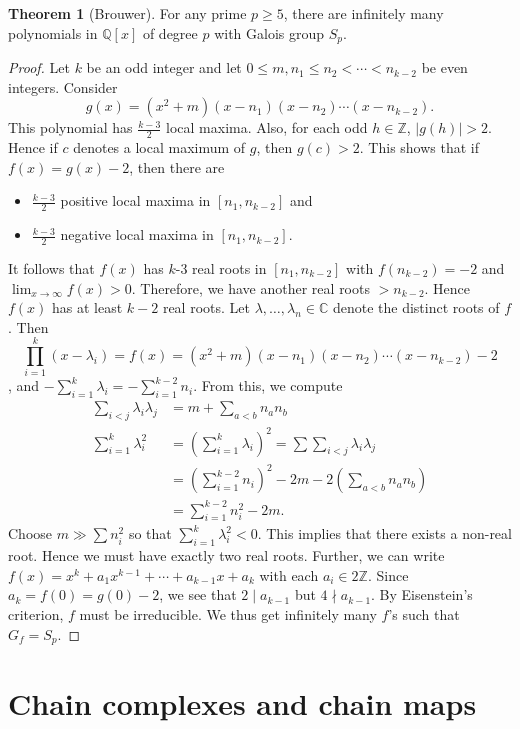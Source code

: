 \documentclass[10pt,letterpaper,cm]{nupset}
\theoremstyle{definition}
\theoremstyle{theorem}
\newtheorem{theorem}[definition]{Theorem}
\theoremstyle{remark}
\newcommand{\C}{\mathbb C}
\newcommand{\Q}{\mathbb Q}
\newcommand{\Z}{\mathbb Z}
\newcommand{\1}{\mathbf{1}}
\newcommand{\0}{\vec 0}
\begin{document}
\begin{theorem}[Brouwer]
For any prime $p \geq 5$, there are infinitely many polynomials in $\Q[x]$ of degree $p$ with Galois group $S_p$.
\end{theorem}
\begin{proof}
Let $k$ be an odd integer and let $0\leq m, n_1 \leq n_2 < \cdots < n_{k-2}$ be even integers. Consider $$g(x) = (x^2 +m)(x-n_1)(x-n_2) \cdots (x-n_{k-2}).$$ This polynomial has $\frac{k-3}{2}$ local maxima. Also, for each odd $h\in \Z$, $\left\lvert{g(h)}\right\rvert >2$. Hence if $c$ denotes a local maximum of $g$, then $g(c) >2$. This shows that if $f(x) = g(x) -2$, then there are 
\begin{itemize}
\item $\frac{k-3}{2}$ positive local maxima in $[n_1, n_{k-2}]$ and
\item $\frac{k-3}{2}$ negative local maxima in $[n_1, n_{k-2}]$.
\end{itemize}
It follows that $f(x)$ has $k$-3 real roots in $[n_1, n_{k-2}]$ with $f(n_{k-2}) = {-2}$ and $\lim_{x\to \infty} f(x) >0$. Therefore, we have another real roots $> n_{k-2}$. Hence $f(x)$ has at least $k-2$ real roots. Let $\lambda, \ldots, \lambda_n \in \C$ denote the distinct roots of $f$. Then $$\prod_{i=1}^k(x-\lambda_i) = f(x) = (x^2 +m)(x-n_1)(x-n_2) \cdots (x-n_{k-2}) -2$$, and ${-}\sum_{i=1}^k \lambda_i = {- \sum_{i=1}^{k-2} n_i}$. From this, we compute
\begin{align*}
\sum_{i <j} \lambda_i \lambda_j & = m + \sum_{a < b} n_an_b 
\\ \sum_{i=1}^k \lambda_i^2 & = \left(\sum_{i=1}^k \lambda_i \right)^2 = \sum \sum_{i<j} \lambda _i \lambda_j
\\ & = \left( \sum_{i=1}^{k-2} n_i \right)^2 -2m - 2 \left( \sum_{a<b} n_an_b \right)
\\ & = \sum_{i=1}^{k-2} n_i^2 - 2m.
\end{align*}
Choose $m \gg \sum n_i^2$ so that $\sum_{i=1}^k \lambda_i^2  < 0$. This implies that there exists a non-real root. Hence we must have exactly two real roots. Further,  we can write $f(x) = x^k + a_1x^{k-1} + \cdots +a_{k-1} x +a_k$ with each $a_i \in 2\Z$. Since $a_k = f(0) = g(0) -2$, we see that $2 \mid a_{k-1}$ but $4 \nmid a_{k-1}$. By Eisenstein's criterion, $f$ must be irreducible. We thus get infinitely many $f$'s such that $G_f = S_p$. 
\end{proof}

\section{Chain complexes and chain maps}
\end{document}
